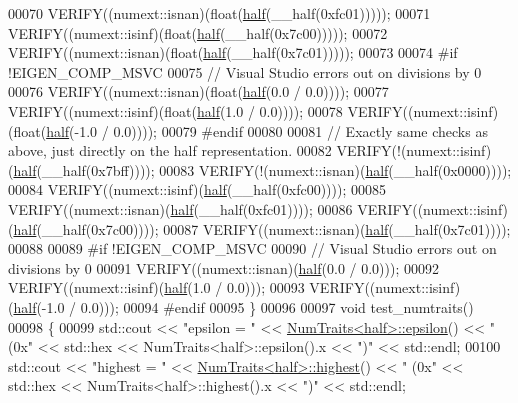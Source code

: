 \begin{DoxyCode}
00070   VERIFY((numext::isnan)(\textcolor{keywordtype}{float}(\hyperlink{struct_eigen_1_1half}{half}(\_\_half(0xfc01)))));
00071   VERIFY((numext::isinf)(\textcolor{keywordtype}{float}(\hyperlink{struct_eigen_1_1half}{half}(\_\_half(0x7c00)))));
00072   VERIFY((numext::isnan)(\textcolor{keywordtype}{float}(\hyperlink{struct_eigen_1_1half}{half}(\_\_half(0x7c01)))));
00073 
00074 \textcolor{preprocessor}{#if !EIGEN\_COMP\_MSVC}
00075   \textcolor{comment}{// Visual Studio errors out on divisions by 0}
00076   VERIFY((numext::isnan)(\textcolor{keywordtype}{float}(\hyperlink{struct_eigen_1_1half}{half}(0.0 / 0.0))));
00077   VERIFY((numext::isinf)(\textcolor{keywordtype}{float}(\hyperlink{struct_eigen_1_1half}{half}(1.0 / 0.0))));
00078   VERIFY((numext::isinf)(\textcolor{keywordtype}{float}(\hyperlink{struct_eigen_1_1half}{half}(-1.0 / 0.0))));
00079 \textcolor{preprocessor}{#endif}
00080 
00081   \textcolor{comment}{// Exactly same checks as above, just directly on the half representation.}
00082   VERIFY(!(numext::isinf)(\hyperlink{struct_eigen_1_1half}{half}(\_\_half(0x7bff))));
00083   VERIFY(!(numext::isnan)(\hyperlink{struct_eigen_1_1half}{half}(\_\_half(0x0000))));
00084   VERIFY((numext::isinf)(\hyperlink{struct_eigen_1_1half}{half}(\_\_half(0xfc00))));
00085   VERIFY((numext::isnan)(\hyperlink{struct_eigen_1_1half}{half}(\_\_half(0xfc01))));
00086   VERIFY((numext::isinf)(\hyperlink{struct_eigen_1_1half}{half}(\_\_half(0x7c00))));
00087   VERIFY((numext::isnan)(\hyperlink{struct_eigen_1_1half}{half}(\_\_half(0x7c01))));
00088 
00089 \textcolor{preprocessor}{#if !EIGEN\_COMP\_MSVC}
00090   \textcolor{comment}{// Visual Studio errors out on divisions by 0}
00091   VERIFY((numext::isnan)(\hyperlink{struct_eigen_1_1half}{half}(0.0 / 0.0)));
00092   VERIFY((numext::isinf)(\hyperlink{struct_eigen_1_1half}{half}(1.0 / 0.0)));
00093   VERIFY((numext::isinf)(\hyperlink{struct_eigen_1_1half}{half}(-1.0 / 0.0)));
00094 \textcolor{preprocessor}{#endif}
00095 \}
00096 
00097 \textcolor{keywordtype}{void} test\_numtraits()
00098 \{
00099   std::cout << \textcolor{stringliteral}{"epsilon       = "} << \hyperlink{group___core___module_struct_eigen_1_1_num_traits}{NumTraits<half>::epsilon}() << \textcolor{stringliteral}{"  (0x"} << 
      std::hex << NumTraits<half>::epsilon().x << \textcolor{stringliteral}{")"} << std::endl;
00100   std::cout << \textcolor{stringliteral}{"highest       = "} << \hyperlink{group___core___module_struct_eigen_1_1_num_traits}{NumTraits<half>::highest}() << \textcolor{stringliteral}{"  (0x"} << 
      std::hex << NumTraits<half>::highest().x << \textcolor{stringliteral}{")"} << std::endl;

\end{DoxyCode}
